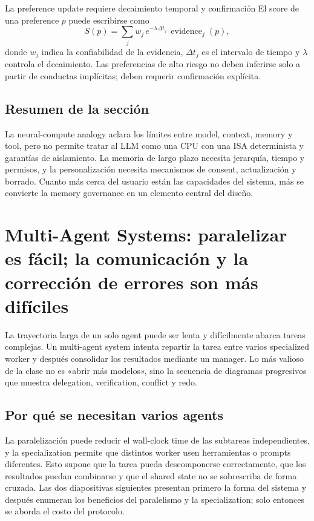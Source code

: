 \documentclass[a4paper]{article}
\begin{document}
\begin{importantbox}{La preference update requiere decaimiento temporal y confirmación}
El score de una preference $p$ puede escribirse como
\[
S(p)=\sum_j w_j\,e^{-\lambda\Delta t_j}\,\operatorname{evidence}_j(p),
\]
donde $w_j$ indica la confiabilidad de la evidencia, $\Delta t_j$ es el intervalo de tiempo y $\lambda$ controla el decaimiento. Las preferencias de alto riesgo no deben inferirse solo a partir de conductas implícitas; deben requerir confirmación explícita.
\end{importantbox}

\subsection{Resumen de la sección}

La neural-compute analogy aclara los límites entre model, context, memory y tool, pero no permite tratar al LLM como una CPU con una ISA determinista y garantías de aislamiento. La memoria de largo plazo necesita jerarquía, tiempo y permisos, y la personalización necesita mecanismos de consent, actualización y borrado. Cuanto más cerca del usuario están las capacidades del sistema, más se convierte la memory governance en un elemento central del diseño.
\section{Multi-Agent Systems: paralelizar es fácil; la comunicación y la corrección de errores son más difíciles}

La trayectoria larga de un solo agent puede ser lenta y difícilmente abarca tareas complejas. Un multi-agent system intenta repartir la tarea entre varios specialized worker y después consolidar los resultados mediante un manager. Lo más valioso de la clase no es «abrir más modelos», sino la secuencia de diagramas progresivos que muestra delegation, verification, conflict y redo.

\subsection{Por qué se necesitan varios agents}

La paralelización puede reducir el wall-clock time de las subtareas independientes, y la specialization permite que distintos worker usen herramientas o prompts diferentes. Esto supone que la tarea pueda descomponerse correctamente, que los resultados puedan combinarse y que el shared state no se sobrescriba de forma cruzada. Las dos diapositivas siguientes presentan primero la forma del sistema y después enumeran los beneficios del paralelismo y la specialization; solo entonces se aborda el costo del protocolo.
\end{document}
